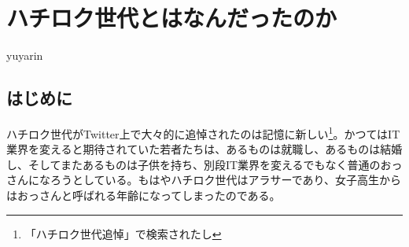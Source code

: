 
\chapter{ハチロク世代とはなんだったのか}

\begin{flushright}
 yuyarin %
\end{flushright}

\section{はじめに}

\lettrine{ハ}
チロク世代がTwitter上で大々的に追悼されたのは記憶に新しい\footnote{「ハチロク世代追悼」で検索されたし}。かつてはIT業界を変えると期待されていた若者たちは、あるものは就職し、あるものは結婚し、そしてまたあるものは子供を持ち、別段IT業界を変えるでもなく普通のおっさんになろうとしている。もはやハチロク世代はアラサーであり、女子高生からはおっさんと呼ばれる年齢になってしまったのである。
